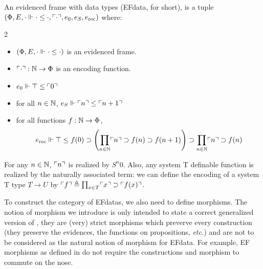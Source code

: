 \documentclass[a4paper,UKenglish,cleveref, autoref, thm-restate]{lipics-v2021}
\begin{document}
\begin{definition}
  An evidenced frame with data types (EFdata, for short),
  is a tuple $(\Phi,E,\cdot \Vdash \cdot \leq \cdot, \ulcorner\cdot\urcorner, e_0, e_S, e_{\mathrm{rec}})$ where:\vspace{-1em}
  \begin{multicols}{2}
  \begin{itemize}
  \item $(\Phi,E,\cdot \Vdash \cdot \leq \cdot)$ is an evidenced frame.
  \item $\ulcorner\cdot\urcorner : \mathbb N \to \Phi$ is an encoding function. %
  \item $e_0 \Vdash \top \leq \ulcorner0\urcorner$
  \item for all $n \in \mathbb N$, $e_S \Vdash \ulcorner n\urcorner \leq \ulcorner n + 1\urcorner$
  \end{itemize}
  \end{multicols}
  \vspace{-2.2em}
  \begin{itemize}
     \item for all functions $f : \mathbb N \to \Phi$,
    \[e_{\mathrm{rec}} \Vdash \top \leq f(0) \supset \left(\prod_{n \in \mathbb N}\ulcorner n\urcorner \supset f(n) \supset f(n+1)\right) \supset \prod_{n \in \mathbb N} \ulcorner n\urcorner \supset f(n)\]
  \end{itemize}
\end{definition}

\begin{remark}
  For any $n \in \mathbb N$, $\ulcorner n\urcorner$ is realized by $S^n 0$. Also, any system T definable function is realized by the naturally associated term: we can define the encoding of a system T type $T \to U$ by $\ulcorner f\urcorner \triangleq \prod_{x \in T} \ulcorner x\urcorner \supset \ulcorner f(x)\urcorner$.
\end{remark}

To construct the category of EFdatas, we also need to define morphisms.
The notion of morphism we introduce is only intended to state a correct generalized version
of , they are (very) strict morphisms which preverve every construction
(they preserve the evidences, the functions on propositions, \textit{etc.})
and are not to be considered as the natural notion of morphism for EFdata.
For example, EF morphisms as defined in \cite{CohMiqTat21} do not require
the constructions and morphism to commute on the nose.
\end{document}
